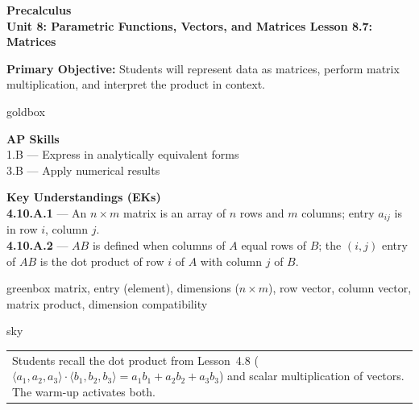 \documentclass[10pt]{article}
\newcommand{\CourseName}{Precalculus}
\newcommand{\UnitNumberName}{Unit 8: Parametric Functions, Vectors, and Matrices \quad}
\newcommand{\LessonNumberName}{Lesson 8.7: Matrices}
\begin{document}
\begin{center}
    {\Large\bfseries \CourseName \\[4pt]
    {\small\bfseries \UnitNumberName \LessonNumberName}}
\end{center}

\begin{tcolorbox}[colback=sky, colframe=navy, boxrule=0.9pt, arc=2mm,
    left=2mm, right=2mm, top=1.5mm, bottom=1.5mm]
    \textbf{Primary Objective:} Students will represent data as matrices,
    perform matrix multiplication, and interpret the product in context.
\end{tcolorbox}

\renewcommand{\arraystretch}{1.6}
\begin{skillbox}{goldbox}
    \begin{minipage}[t]{0.46\linewidth}\vspace{0pt}
        \textbf{AP Skills}\\
        1.B --- Express in analytically equivalent forms\\
        3.B --- Apply numerical results
    \end{minipage}
    \hfill
    \begin{minipage}[t]{0.50\linewidth}\vspace{0pt}
        \textbf{Key Understandings (EKs)}\\
        \textbf{4.10.A.1} --- An $n \times m$ matrix is an array of $n$ rows and $m$ columns; entry $a_{ij}$ is in row $i$, column $j$.\\[2pt]
        \textbf{4.10.A.2} --- $AB$ is defined when columns of $A$ equal rows of $B$; the $(i,j)$ entry of $AB$ is the dot product of row $i$ of $A$ with column $j$ of $B$.
    \end{minipage}
\end{skillbox}

\begin{skillbox}{greenbox}
    matrix, entry (element), dimensions ($n \times m$), row vector, column vector, matrix product, dimension compatibility
\end{skillbox}

\begin{skillbox}{sky}
    \begin{tabularx}{\linewidth}{@{}X@{}}
        Students recall the dot product from Lesson~4.8 ($\langle a_1, a_2, a_3\rangle \cdot \langle b_1, b_2, b_3\rangle = a_1 b_1 + a_2 b_2 + a_3 b_3$) and scalar multiplication of vectors. The warm-up activates both.
    \end{tabularx}
\end{skillbox}
\end{document}
